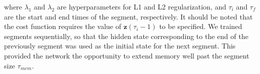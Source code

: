 where $\lambda_1$ and $\lambda_2$ are hyperparameters for L1 and L2 regularization, and $\tau_i$ and $\tau_f$ are the start and end times of the segment, respectively. It should be noted that the cost function requires the value of $\textbf{z}(\tau_i - 1)$ to be specified. We trained segments sequentially, so that the hidden state corresponding to the end of the previously segment was used as the initial state for the next segment. This provided the network the opportunity to extend memory well past the segment size $\tau_{mem}$.






















